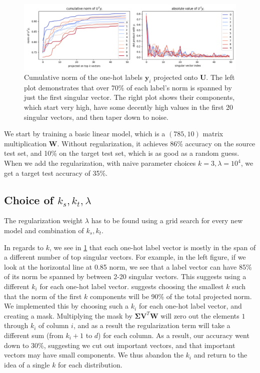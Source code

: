 \documentclass[twoside,11pt]{article}
\begin{document}
\begin{figure}[htbp]
  \centering
  \includegraphics[width=1.0\textwidth]{img/cumulative_norm.png}
  \caption{Cumulative norm of the one-hot labels $\mathbf{y}_i$ projected onto $\mathbf{U}$. The left plot demonstrates that over 70\% of each label's norm is spanned by just the first singular vector. The right plot shows their components, which start very high, have some decently high values in the first 20 singular vectors, and then taper down to noise.}
  \label{fig:cumulative_norm}
\end{figure}

We start by training a basic linear model, which is a $(785, 10)$ matrix multiplication $\mathbf{W}$. Without regularization, it achieves 86\% accuracy on the source test set, and 10\% on the target test set, which is as good as a random guess. When we add the regularization, with naive parameter choices $k=3, \lambda=10^4$, we get a target test accuracy of 35\%.

\subsection{Choice of $k_s, k_t, \lambda$}

The regularization weight $\lambda$ has to be found using a grid search for every new model and combination of $k_s, k_t$. 

In regards to $k$, we see in \ref{fig:cumulative_norm} that each one-hot label vector is mostly in the span of a different number of top singular vectors. For example, in the left figure, if we look at the horizontal line at 0.85 norm, we see that a label vector can have 85\% of its norm be spanned by between 2-20 singular vectors. This suggests using a different $k_i$ for each one-hot label vector. \cite{imani2022label} suggests choosing the smallest $k$ such that the norm of the first $k$ components will be 90\% of the total projected norm. We implemented this by choosing such a $k_i$ for each one-hot label vector, and creating a mask. Multiplying the mask by $\mathbf{\Sigma V}^T \mathbf{W}$ will zero out the elements $1$ through $k_i$ of column $i$, and as a result the regularization term will take a different sum (from $k_i + 1$ to $d$) for each column. As a result, our accuracy went down to 30\%, suggesting we cut out important vectors, and that important vectors may have small components. We thus abandon the $k_i$ and return to the idea of a single $k$ for each distribution.
\end{document}
